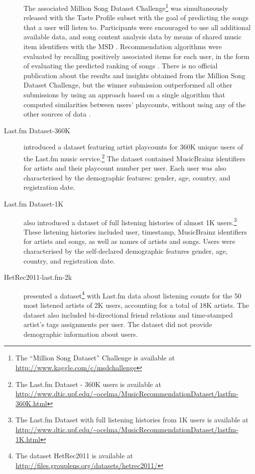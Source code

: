 \begin{description}
The associated Million Song Dataset Challenge\footnote{The ``Million Song Dataset'' Challenge is available at \url{http://www.kaggle.com/c/msdchallenge}} was simultaneously released with the Taste Profile subset with the goal of predicting the songs that a user will listen to. Participants were encouraged to use all additional available data, and song content analysis data by means of shared music item identifiers with the MSD \autocite{bertin11million}. 
Recommendation algorithms were evaluated by recalling positively associated items for each user, in the form of evaluating the predicted ranking of songs \autocite{mcfee12million}. 
There is no official publication about the results and insights obtained from the Million Song Dataset Challenge, but the winner submission outperformed all other submissions by using an approach based on a single algorithm that computed similarities between users' playcounts, without using any of the other sources of data \autocite{aiolli12preliminary}.



\item [Last.fm Dataset-360K] \textcite{celma10music} introduced a dataset featuring artist playcounts for 360K unique users of the Last.fm music service.\footnote{The Last.fm Dataset - 360K users is available at \url{http://www.dtic.upf.edu/~ocelma/MusicRecommendationDataset/lastfm-360K.html}} 
The dataset contained MusicBrainz identifiers for artists and their playcount number per user. Each user was also characterised by the demographic features: gender, age, country, and registration date.

\item [Last.fm Dataset-1K] \textcite{celma10music} also introduced a dataset of full listening histories of almost 1K users.\footnote{The Last.fm Dataset with full listening histories from 1K users is available at \url{http://www.dtic.upf.edu/~ocelma/MusicRecommendationDataset/lastfm-1K.html}} These listening histories included user, timestamp, MusicBrainz identifiers for artists and songs, as well as names of artists and songs. Users were characterised by the self-declared demographic features gender, age, country, and registration date.

\item [HetRec2011-last.fm-2k] \textcite{cantador11workshop} presented a dataset\footnote{The dataset HetRec2011 is available at \url{http://files.grouplens.org/datasets/hetrec2011/}} with Last.fm data about listening counts for the 50 most listened artists of 2K users, accounting for a total of 18K artists. The dataset also included bi-directional friend relations and time-stamped artist's tags assignments per user. The dataset did not provide demographic information about users. 


\end{description}
